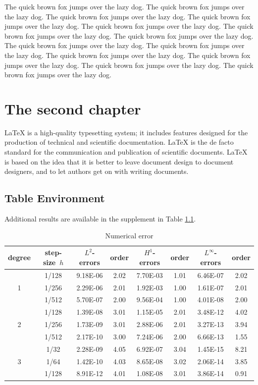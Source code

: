 \documentclass[openany,twoside,12pt]{book}
\theoremstyle{plain}
\numberwithin{equation}{chapter}
\numberwithin{figure}{chapter}
\numberwithin{table}{chapter}
\begin{document}
The quick brown fox jumps over the lazy dog. The quick brown fox jumps over the lazy dog. The quick brown fox jumps over the lazy dog. The quick brown fox jumps over the lazy dog. The quick brown fox jumps over the lazy dog. The quick brown fox jumps over the lazy dog. The quick brown fox jumps over the lazy dog. The quick brown fox jumps over the lazy dog. The quick brown fox jumps over the lazy dog. The quick brown fox jumps over the lazy dog. The quick brown fox jumps over the lazy dog. The quick brown fox jumps over the lazy dog. The quick brown fox jumps over the lazy dog.


\chapter{The second chapter}

LaTeX is a high-quality typesetting system; it includes features designed
for the production of technical and scientific documentation.
LaTeX is the de facto standard for the communication and publication of scientific documents.
LaTeX is based on the idea that it is better to leave document design to
document designers, and to let authors get on with writing documents.

\section{Table Environment}

Additional results are available in the supplement in Table \ref{tab:foo}.

\begin{table}[!htp]
\centering
\renewcommand\arraystretch{1.2} %
\caption{Numerical error}
\label{tab:foo}
\begin{tabular}{c|c|cc|cc|cc}
\hline
degree &  step-size~$h$  & $L^2$-errors  &  order  & $H^1$-errors & order & $L^\infty$-errors  &  order \\
\hline
   &  1/128    & 9.18E-06    &2.02    & 7.70E-03  &1.01       & 6.46E-07    &2.02   \\
1  &  1/256    & 2.29E-06    &2.01    & 1.92E-03  &1.00       & 1.61E-07    &2.01   \\
   &  1/512    & 5.70E-07    &2.00    & 9.56E-04  &1.00       & 4.01E-08    &2.00   \\
\hline  %
   &  1/128    & 1.39E-08    &3.01    & 1.15E-05  &2.01       & 3.48E-12   &4.02    \\
2  &  1/256    & 1.73E-09    &3.01    & 2.88E-06  &2.01       & 3.27E-13   &3.94    \\
   &  1/512    & 2.17E-10    &3.00    & 7.24E-06  &2.00       & 6.66E-13   &1.55    \\
\hline  %
   &  1/32     & 2.28E-09    &4.05    & 6.92E-07  &3.04       & 1.45E-15   &8.21    \\
3  &  1/64     & 1.42E-10    &4.03    & 8.65E-08  &3.02       & 2.06E-14   &3.85    \\
   &  1/128    & 8.91E-12    &4.01    & 1.08E-08  &3.01       & 3.86E-14   &0.91    \\
\hline
\end{tabular}
\end{table}
\end{document}
